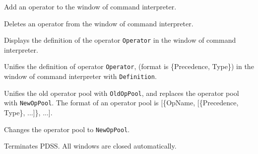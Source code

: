 \begin{itemize}
Add an operator to the window of command interpreter.

Deletes an operator from the window of command interpreter.

Displays the definition of the operator \verb|Operator| in the window of 
command interpreter.

Unifies the definition of operator \verb|Operator|, (format is 
\{Precedence, Type\}) in the window of command interpreter with 
\verb|Definition|.

Unifies the old operator pool with \verb|OldOpPool|, and replaces the operator
pool with \verb|NewOpPool|. The format of an operator pool is
[\{OpName, [\{Precedence, Type\}, ...]\}, ...].

Changes the operator pool to \verb|NewOpPool|.

Terminates PDSS. All windows are closed automatically.

\end{itemize}
\vspace{1ex}

